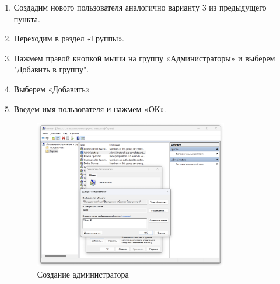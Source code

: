 \documentclass[a4paper, 14pt]{report}
\begin{document}
\begin{enumerate}
    \item Создадим нового пользователя аналогично варианту 3 из предыдущего пункта.
    \item Переходим в раздел «Группы».
    \item Нажмем правой кнопкой мыши на группу «Администраторы» и выберем "Добавить в группу".
    \item Выберем «Добавить»
    \item Введем имя пользователя и нажмем «ОК».
          {
          \begin{figure}[H]
              \centering
              \includegraphics[width=0.8\textwidth]{../images/lusrmgr_create_admin.png}
              \caption{Создание администратора}
          \end{figure}
          }
\end{enumerate}
\end{document}
